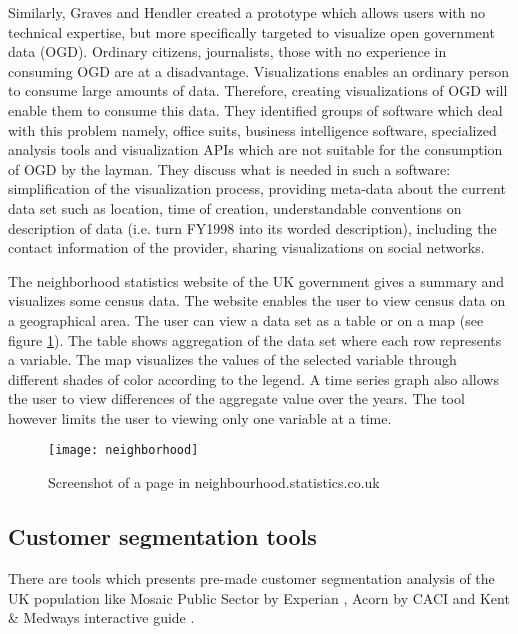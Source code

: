 Similarly, Graves and Hendler \cite{gravesvisualization2013} created a prototype which allows users with no technical expertise, but more specifically targeted to visualize open government data (OGD). Ordinary citizens, journalists, those with no experience in consuming OGD are at a disadvantage. Visualizations enables an ordinary person to consume large amounts of data. Therefore, creating visualizations of OGD will enable them to consume this data. They identified groups of software which deal with this problem namely, office suits, business intelligence software, specialized analysis tools and visualization APIs which are not suitable for the consumption of OGD by the layman. They discuss what is needed in such a software: simplification of the visualization process, providing meta-data about the current data set such as location, time of creation, understandable conventions on description of data (i.e. turn FY1998 into its worded description), including the contact information of the provider, sharing visualizations on social networks.\par

The neighborhood statistics website \cite{neighbourhoodstatistics} of the UK government gives a summary and visualizes some census data. The website enables the user to view census data on a geographical area. The user can view a data set as a table or on a map (see figure \ref{fig:neighborhood}). The table shows aggregation of the data set where each row represents a variable. The map visualizes the values of the selected variable through different shades of color according to the legend. A time series graph also allows the user to view differences of the aggregate value over the years. The tool however limits the user to viewing only one variable at a time.\par

\begin{figure}[h]
\centering
\texttt{[image: neighborhood]}
\caption{Screenshot of a page in neighbourhood.statistics.co.uk}
\label{fig:neighborhood}
\end{figure}

\subsection{Customer segmentation tools}

There are tools which presents pre-made customer segmentation analysis of the UK population like Mosaic Public Sector by Experian \cite{experian}, Acorn by CACI \cite{acornuserguide} and Kent \& Medway\textsc{}s interactive guide \cite{kentmidway}. \par

